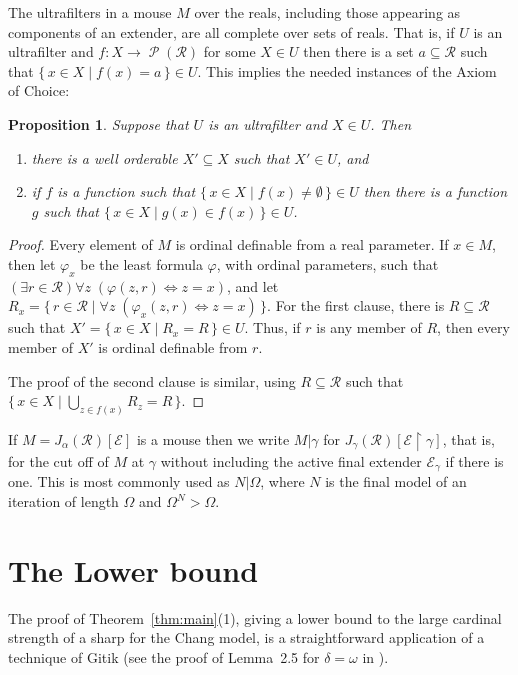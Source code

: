 \documentclass[
twoside,
]{article}
\newtheorem{proposition}[theorem]{Proposition}
\theoremstyle{definition}
\theoremstyle{remark}
\newcommand{\ords}{\Omega}
\DeclareMathOperator{\ps}{\mathcal{P}}
\newcommand\reals{\mathcal{R}}
\renewcommand{\phi}{\varphi}
\newcommand{\cut}{{\vert}}
\newcommand{\set}[1]{\{\,#1\,\}}
\newcommand{\restrict}{{\upharpoonright}}
\begin{document}
The ultrafilters in a mouse $M$ over the reals, including those
appearing as components of an extender, are all complete over sets of
reals.  That is, if $U$ is an ultrafilter and $f\colon
X\to\ps(\reals)$ for some $X\in U$ then there is a set $a\subseteq \reals$
such that $\set{x\in X\mid f(x)=a}\in U$.   This implies the needed
instances of the Axiom of Choice:
\begin{proposition}
  \label{thm:enoughAC}
  Suppose that $U$ is an ultrafilter and $X\in U$. Then
  \begin{enumerate}
  \item there is a well orderable  $X'\subseteq X$ such that
    $X'\in U$,
    and
  \item if $f$ is a function such that $\set{x\in X\mid
      f(x)\not=\emptyset}\in U$ then there is a function $g$ such that
    $\set{x\in X\mid g(x)\in f(x)}\in U$.
  \end{enumerate}
\end{proposition}
\begin{proof}
  Every element of $M$ is ordinal definable from a real parameter.  If
  $x\in M$, then let $\phi_x$ be the least formula $\phi$, with ordinal
  parameters, such that $(\exists r\in\reals)\forall
  z\;(\phi(z,r)\iff z=x)$, and let $R_x=\set{r\in\reals\mid\forall
    z\;(\phi_x(z,r)\iff z=x)}$.    For the first clause, there is
  $R\subseteq \reals$ such that $X'=\set{x\in X\mid R_x=R}\in U$.
  Thus, if $r$ is any member of $R$, then every member of $X'$ is
  ordinal definable from $r$.

  The proof of the second clause is similar, using $R\subseteq \reals$
  such that $\set{x\in X\mid \bigcup_{z\in f(x)}R_z = R}$.
\end{proof}

If $M=J_{\alpha}(\reals)[\mathcal{E}]$ is a mouse then we write
$M\cut\gamma$ for $J_{\gamma}(\reals)[\mathcal{E}\restrict\gamma]$,
that is, for the cut off of $M$ at $\gamma$ without including the
active final extender $\mathcal{E}_{\gamma}$ if there is one.    This
is most commonly used as $N\cut\ords$, where   $N$
is the final model of an iteration of length $\ords$ and $\ords^{N}>\ords$.

\section{The Lower bound}
\label{sec:lower}
The proof of Theorem~\ref{thm:main}(1), giving a lower bound to
the large cardinal strength of a sharp for the Chang model, is  a
straightforward application of a technique 
of Gitik (see the proof of Lemma~2.5 for $\delta=\omega$ in \cite{gitik-mitchell.ext-indisc}).
\end{document}
